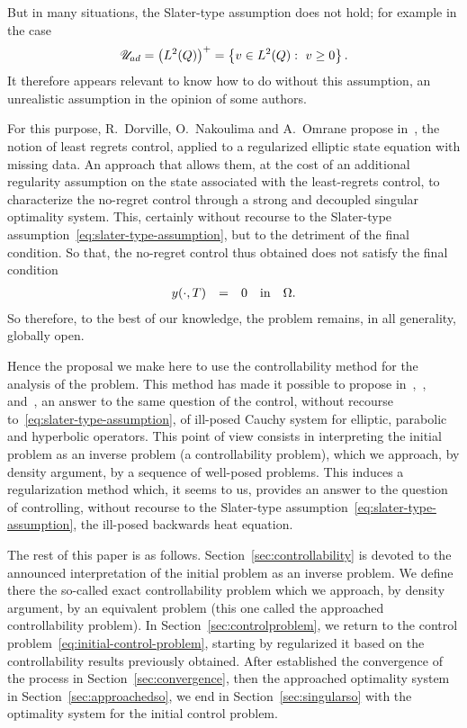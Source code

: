 But in many situations, the Slater-type assumption does not hold; for
example in the case
\begin{equation*}
    \uad = {\left({\Ldeux{Q}}\right)}^{+} = \left\{{%
        v\in\Ldeux{Q}:\ v\geq 0
    }\right\}.
\end{equation*}
It therefore appears relevant to know how to do without this assumption, an
unrealistic assumption in the opinion of some authors.

For this purpose,  R.~Dorville, O.~Nakoulima and A.~Omrane propose
in~\cite{dorville}, the notion of least regrets control, applied to a
regularized elliptic state equation with missing data. An approach that
allows them, at the cost of an additional regularity assumption on the
state associated with the least-regrets control, to characterize the
no-regret control through a strong and decoupled singular optimality
system. This, certainly without recourse to the Slater-type
assumption~\eqref{eq:slater-type-assumption}, but to the detriment of the
final condition. So that, the no-regret control thus obtained does not
satisfy the final condition
\begin{equation*}
    \begin{array}{rclll}
        {y}\!\left({\cdot,T}\right) & = & 0 & \text{in} & \Omega.
    \end{array}
\end{equation*}
So therefore, to the best of our knowledge, the problem remains, in all
generality, globally open.

Hence the proposal we make here to use the controllability method for the
analysis of the problem. This method has made it possible to propose
in~\cite{ownElliptic},~\cite{ownAAA},~\cite{ownParabolic}
and~\cite{ownhyperbolic}, an answer to the same question of the control,
without recourse to~\eqref{eq:slater-type-assumption}, of ill-posed Cauchy
system for elliptic, parabolic and hyperbolic operators. This point of view
consists in interpreting the initial problem as an inverse problem (a
controllability problem), which we approach, by density argument, by a
sequence of well-posed problems. This induces a regularization method
which, it seems to us, provides an answer to the question of controlling,
without recourse to the Slater-type
assumption~\eqref{eq:slater-type-assumption}, the ill-posed backwards heat
equation.

The rest of this paper is as follows. Section~\ref{sec:controllability}
is devoted to the announced interpretation of the initial problem as an
inverse problem. We define there the so-called exact controllability
problem which we approach, by density argument, by an equivalent problem
(this one called the approached controllability problem). In
Section~\ref{sec:controlproblem}, we return to the control
problem~\eqref{eq:initial-control-problem}, starting by regularized it
based on the controllability results previously obtained. After established
the convergence of the process in Section~\ref{sec:convergence}, then the
approached optimality system in Section~\ref{sec:approachedso}, we end in
Section~\ref{sec:singularso} with the optimality system for the initial
control problem.
